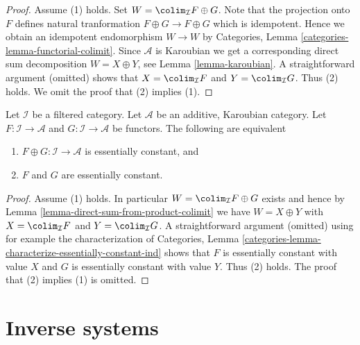 \begin{proof}
Assume (1) holds. Set $W = \colim_\mathcal{I} F \oplus G$.
Note that the projection onto $F$ defines natural tranformation
$F \oplus G \to F \oplus G$ which is idempotent. Hence we obtain
an idempotent endomorphism $W \to W$ by
Categories, Lemma \ref{categories-lemma-functorial-colimit}.
Since $\mathcal{A}$ is Karoubian we get a corresponding direct
sum decomposition $W = X \oplus Y$, see Lemma \ref{lemma-karoubian}.
A straightforward argument (omitted) shows that
$X = \colim_\mathcal{I} F$ and $Y = \colim_\mathcal{I} G$.
Thus (2) holds. We omit the proof that (2) implies (1).
\end{proof}

\begin{lemma}
\label{lemma-direct-sum-from-product-essentially-constant}
Let $\mathcal{I}$ be a filtered category. Let $\mathcal{A}$
be an additive, Karoubian category. Let $F : \mathcal{I} \to \mathcal{A}$ and
$G : \mathcal{I} \to \mathcal{A}$ be functors. The following are equivalent
\begin{enumerate}
\item $F \oplus G : \mathcal{I} \to \mathcal{A}$
is essentially constant, and
\item $F$ and $G$ are essentially constant.
\end{enumerate}
\end{lemma}

\begin{proof}
Assume (1) holds. In particular $W = \colim_\mathcal{I} F \oplus G$ exists
and hence by Lemma \ref{lemma-direct-sum-from-product-colimit}
we have $W = X \oplus Y$ with $X = \colim_\mathcal{I} F$ and
$Y = \colim_\mathcal{I} G$. A straightforward argument (omitted)
using for example the characterization of
Categories, Lemma \ref{categories-lemma-characterize-essentially-constant-ind}
shows that $F$ is essentially constant with value $X$ and $G$ is essentially
constant with value $Y$. Thus (2) holds. The proof that (2) implies (1)
is omitted.
\end{proof}






\section{Inverse systems}
\label{section-inverse-systems}


